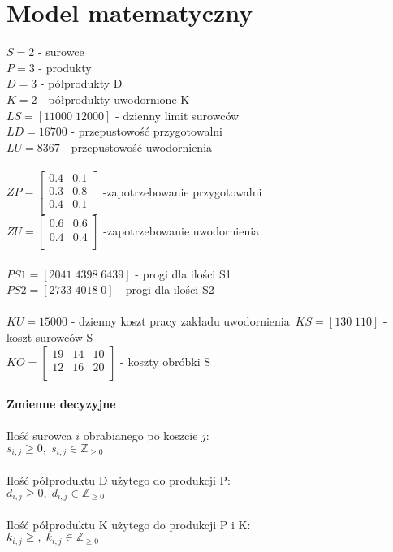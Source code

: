 \documentclass[a4paper, 10pt]{article}
\begin{document}
\section{Model matematyczny}


$S=2$ - surowce \\
$P=3$ - produkty \\
$D=3$ - półprodukty D \\
$K=2$ - półprodukty uwodornione K \\


$LS=[11000 \;12000] $ - dzienny limit surowców \\
$LD = 16700$ - przepustowość przygotowalni\\
$LU = 8367$ - przepustowość uwodornienia \\ \hfill\\
$ZP=
\begin{bmatrix}
0.4 & 0.1  \\
0.3 & 0.8  \\
0.4  & 0.1 \\
\end{bmatrix} $ -zapotrzebowanie przygotowalni\\
$ZU = 
\begin{bmatrix}
0.6 & 0.6  \\
0.4 & 0.4  \\
\end{bmatrix} $ -zapotrzebowanie uwodornienia\\ \hfill\\
$PS1 = [2041 \; 4398 \; 6439] $ - progi dla ilości S1\\
$PS2 = [2733 \; 4018 \; 0] $ - progi dla ilości S2\\ \hfill\\

$KU =  15000 $ - dzienny koszt pracy zakładu uwodornienia\
$KS = [130 \; 110] $ - koszt surowców S\\
$KO = 
\begin{bmatrix}
19 & 14  & 10\\
12 & 16 & 20 \\
\end{bmatrix} $ - koszty obróbki S\\ \hfill\\


{\bf Zmienne decyzyjne\\}
\hfill \\
Ilość surowca $i$ obrabianego po koszcie $j$: \\
$s_{i,j} \ge 0, \; s_{i,j} \in \mathbb Z_{\ge 0}$\\
\hfill\\
Ilość półproduktu D użytego do produkcji P: \\
$d_{i,j}  \ge 0,\; d_{i,j} \in \mathbb Z_{\ge 0}$  \\
\hfill\\
Ilość półproduktu K użytego do produkcji P i K: \\
$k_{i,j}  \ge ,\; k_{i,j} \in \mathbb Z_{\ge 0}$ \\  
\end{document}
